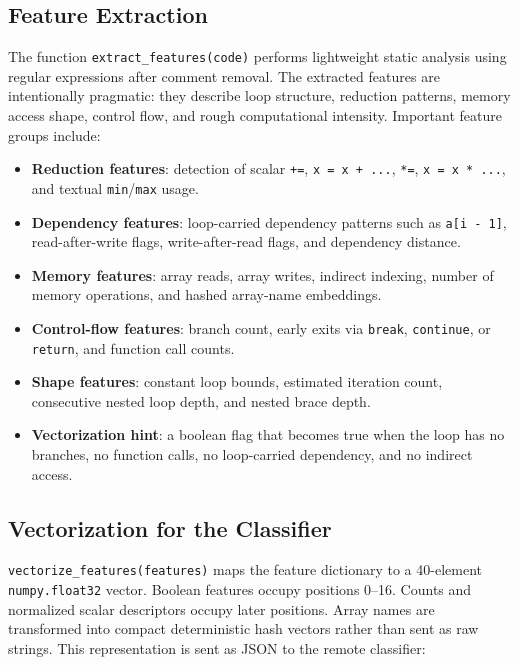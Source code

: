 \documentclass[11pt,a4paper]{article}
\begin{document}
\subsection{Feature Extraction}

The function \texttt{extract\_features(code)} performs lightweight static
analysis using regular expressions after comment removal. The extracted
features are intentionally pragmatic: they describe loop structure, reduction
patterns, memory access shape, control flow, and rough computational intensity.
Important feature groups include:

\begin{itemize}[leftmargin=*]
  \item \textbf{Reduction features}: detection of scalar \texttt{+=},
        \texttt{x = x + ...}, \texttt{*=}, \texttt{x = x * ...}, and textual
        \texttt{min}/\texttt{max} usage.
  \item \textbf{Dependency features}: loop-carried dependency patterns such as
        \texttt{a[i - 1]}, read-after-write flags, write-after-read flags, and
        dependency distance.
  \item \textbf{Memory features}: array reads, array writes, indirect indexing,
        number of memory operations, and hashed array-name embeddings.
  \item \textbf{Control-flow features}: branch count, early exits via
        \texttt{break}, \texttt{continue}, or \texttt{return}, and function call
        counts.
  \item \textbf{Shape features}: constant loop bounds, estimated iteration
        count, consecutive nested loop depth, and nested brace depth.
  \item \textbf{Vectorization hint}: a boolean flag that becomes true when the
        loop has no branches, no function calls, no loop-carried dependency,
        and no indirect access.
\end{itemize}

\subsection{Vectorization for the Classifier}

\texttt{vectorize\_features(features)} maps the feature dictionary to a
40-element \texttt{numpy.float32} vector. Boolean features occupy positions
0--16. Counts and normalized scalar descriptors occupy later positions. Array
names are transformed into compact deterministic hash vectors rather than sent
as raw strings. This representation is sent as JSON to the remote classifier:
\end{document}
